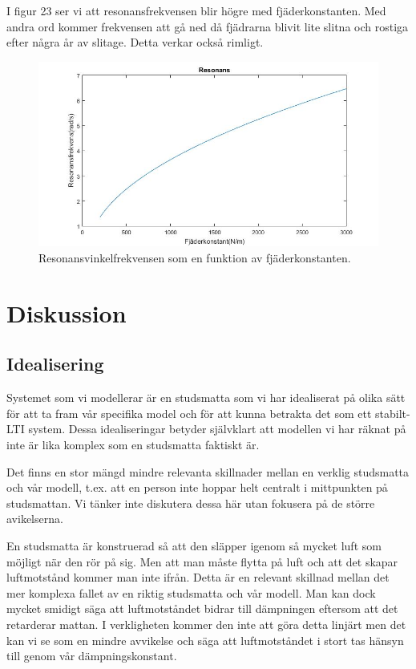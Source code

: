 \documentclass[10pt,a4paper]{article}
\begin{document}
I figur 23 ser vi att resonansfrekvensen blir högre med fjäderkonstanten. Med andra ord kommer frekvensen att gå ned då fjädrarna blivit lite slitna och rostiga efter några år av slitage. Detta verkar också rimligt.

\begin{figure}[h]
\begin{center}
\includegraphics[scale=0.4]{resonansFjader}
\caption{Resonansvinkelfrekvensen som en funktion av fjäderkonstanten.}
\end{center}
\end{figure}



\section{Diskussion}

\subsection{Idealisering}
Systemet som vi modellerar är en studsmatta som vi har idealiserat på olika sätt för att ta fram vår specifika model och för att kunna betrakta det som ett stabilt-LTI system. Dessa idealiseringar betyder självklart att modellen vi har räknat på inte är lika komplex som en studsmatta faktiskt är. 

Det finns en stor mängd mindre relevanta skillnader mellan en verklig studsmatta och vår modell, t.ex. att en person inte hoppar helt centralt i mittpunkten på studsmattan. Vi tänker inte diskutera dessa här utan fokusera på de större avikelserna.

En studsmatta är konstruerad så att den släpper igenom så mycket luft som möjligt när den rör på sig. Men att man måste flytta på luft och att det skapar luftmotstånd kommer man inte ifrån. Detta är en relevant skillnad mellan det mer komplexa fallet av en riktig studsmatta och vår modell. Man kan dock mycket smidigt säga att luftmotståndet bidrar till dämpningen eftersom att det retarderar mattan. I verkligheten kommer den inte att göra detta linjärt men det kan vi se som en mindre avvikelse och säga att luftmotståndet i stort tas hänsyn till genom vår dämpningskonstant.
\end{document}
